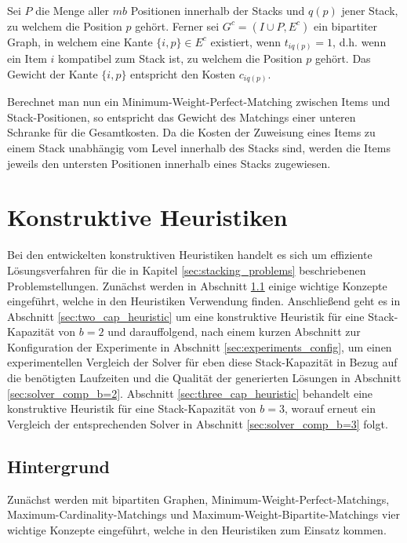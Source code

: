 Sei $P$ die Menge aller $mb$ Positionen innerhalb der Stacks und $q(p)$ jener Stack, zu welchem die Position $p$ gehört.
Ferner sei $G^c = (I \cup P, E^c)$ ein bipartiter Graph, in welchem eine Kante $\{i, p\} \in E^c$ existiert,
wenn $t_{iq(p)} = 1$, d.h. wenn ein Item $i$ kompatibel zum Stack ist, zu welchem die Position $p$ gehört.
Das Gewicht der Kante $\{i, p\}$ entspricht den Kosten $c_{iq(p)}$.

Berechnet man nun ein Minimum-Weight-Perfect-Matching zwischen Items und Stack-Positionen, so entspricht
das Gewicht des Matchings einer unteren Schranke für die Gesamtkosten. Da die Kosten der Zuweisung eines Items
zu einem Stack unabhängig vom Level innerhalb des Stacks sind, werden die Items jeweils den untersten Positionen
innerhalb eines Stacks zugewiesen.

\section{Konstruktive Heuristiken}
\label{sec:constructive_heuristics}

Bei den entwickelten konstruktiven Heuristiken handelt es sich um effiziente Lösungsverfahren für die in Kapitel \ref{sec:stacking_problems} beschriebenen Problemstellungen. Zunächst werden in Abschnitt \ref{sec:digressions} einige wichtige Konzepte eingeführt, welche in den Heuristiken Verwendung finden.
Anschließend geht es in Abschnitt \ref{sec:two_cap_heuristic} um eine konstruktive Heuristik für eine Stack-Kapazität
von $b = 2$ und darauffolgend, nach einem kurzen Abschnitt zur Konfiguration der Experimente in Abschnitt \ref{sec:experiments_config}, um einen experimentellen Vergleich der Solver für eben diese Stack-Kapazität in Bezug
auf die benötigten Laufzeiten und die Qualität der generierten Lösungen in Abschnitt \ref{sec:solver_comp_b=2}.
Abschnitt \ref{sec:three_cap_heuristic} behandelt eine konstruktive Heuristik für eine Stack-Kapazität von $b=3$, worauf erneut ein Vergleich der entsprechenden Solver in Abschnitt \ref{sec:solver_comp_b=3} folgt.

\vfill
\pagebreak

\subsection{Hintergrund}
\label{sec:digressions}

Zunächst werden mit bipartiten Graphen, Minimum-Weight-Perfect-Matchings, Maximum-Cardinality-Matchings und Maximum-Weight-Bipartite-Matchings vier wichtige Konzepte eingeführt, welche in den Heuristiken zum Einsatz kommen.

